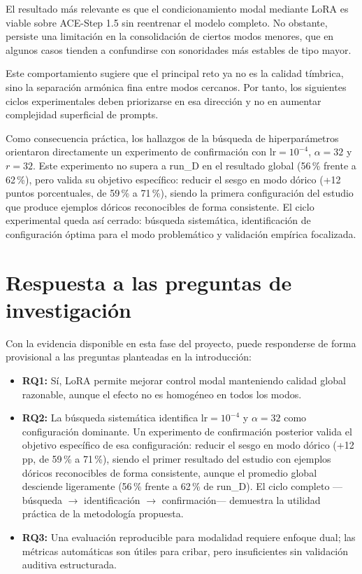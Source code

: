 \documentclass[%
    school=etsisi,%
    type=pfg,%
    degree=61CD,%
]{upm-report}
\begin{document}
El resultado m\'as relevante es que el condicionamiento modal mediante LoRA es viable sobre ACE-Step 1.5 sin reentrenar el modelo completo. No obstante, persiste una limitaci\'on en la consolidaci\'on de ciertos modos menores, que en algunos casos tienden a confundirse con sonoridades m\'as estables de tipo mayor.

Este comportamiento sugiere que el principal reto ya no es la calidad t\'imbrica, sino la separaci\'on arm\'onica fina entre modos cercanos. Por tanto, los siguientes ciclos experimentales deben priorizarse en esa direcci\'on y no en aumentar complejidad superficial de prompts.

Como consecuencia pr\'actica, los hallazgos de la b\'usqueda de hiperpar\'ametros orientaron directamente un experimento de confirmaci\'on con $\text{lr} = 10^{-4}$, $\alpha = 32$ y $r = 32$. Este experimento no supera a run\_D en el resultado global (56\,\% frente a 62\,\%), pero valida su objetivo espec\'ifico: reducir el sesgo en modo d\'orico (+12 puntos porcentuales, de 59\,\% a 71\,\%), siendo la primera configuraci\'on del estudio que produce ejemplos d\'oricos reconocibles de forma consistente. El ciclo experimental queda as\'i cerrado: b\'usqueda sistem\'atica, identificaci\'on de configuraci\'on \'optima para el modo problem\'atico y validaci\'on emp\'irica focalizada.

\section{Respuesta a las preguntas de investigaci\'on}

Con la evidencia disponible en esta fase del proyecto, puede responderse de forma provisional a las preguntas planteadas en la introducci\'on:

\begin{itemize}
    \item \textbf{RQ1:} S\'i, LoRA permite mejorar control modal manteniendo calidad global razonable, aunque el efecto no es homog\'eneo en todos los modos.
    \item \textbf{RQ2:} La b\'usqueda sistem\'atica identifica $\text{lr} = 10^{-4}$ y $\alpha = 32$ como configuraci\'on dominante. Un experimento de confirmaci\'on posterior valida el objetivo espec\'ifico de esa configuraci\'on: reducir el sesgo en modo d\'orico (+12\,pp, de 59\,\% a 71\,\%), siendo el primer resultado del estudio con ejemplos d\'oricos reconocibles de forma consistente, aunque el promedio global desciende ligeramente (56\,\% frente a 62\,\% de run\_D). El ciclo completo ---b\'usqueda $\to$ identificaci\'on $\to$ confirmaci\'on--- demuestra la utilidad pr\'actica de la metodolog\'ia propuesta.
    \item \textbf{RQ3:} Una evaluaci\'on reproducible para modalidad requiere enfoque dual; las m\'etricas autom\'aticas son \'utiles para cribar, pero insuficientes sin validaci\'on auditiva estructurada.
\end{itemize}
\end{document}

